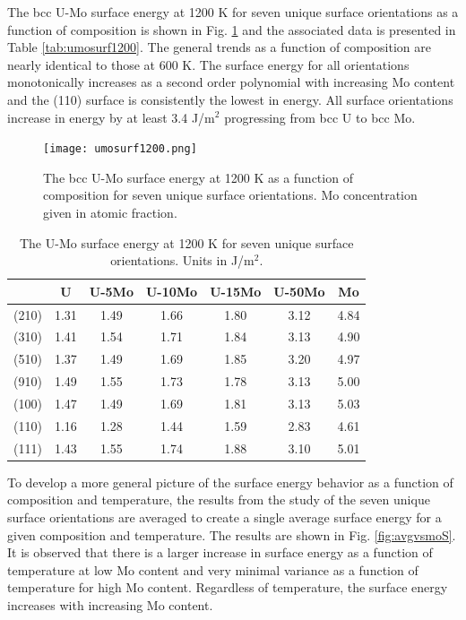 \documentclass[review]{elsarticle}
\begin{document}
\FloatBarrier

The bcc U-Mo surface energy at 1200 K for seven unique surface orientations as a function of composition is shown in Fig. \ref{fig:umosurf1200} and the associated data is presented in Table \ref{tab:umosurf1200}. The general trends as a function of composition are nearly identical to those at 600 K. The surface energy for all orientations monotonically increases as a second order polynomial with increasing Mo content and the (110) surface is consistently the lowest in energy. All surface orientations increase in energy by at least 3.4 J/m$^{2}$ progressing from bcc U to bcc Mo. 

\begin{figure}[h]
 \centering
 \texttt{[image: umosurf1200.png]} 
 \caption{The bcc U-Mo surface energy at 1200 K as a function of composition for seven unique surface orientations. Mo concentration given in atomic fraction.}
 \label{fig:umosurf1200}
\end{figure}

\begin{table}[h]
\caption{The U-Mo surface energy at 1200 K for seven unique surface orientations. Units in J/m$^{2}$.} \label{tab:umosurf1200}
\begin{center}
\begin{tabular}{|c|c|c|c|c|c|c|}
	\hline
 & U & U-5Mo & U-10Mo & U-15Mo & U-50Mo & Mo \\
\hline
(210) & 1.31 & 1.49 & 1.66 & 1.80 & 3.12 & 4.84 \\
(310)	 & 1.41 & 1.54 & 1.71 & 1.84 & 3.13 & 4.90 \\ 
(510)	 & 1.37 & 1.49 & 1.69 & 1.85 & 3.20 & 4.97 \\
(910)	 & 1.49 & 1.55 & 1.73 & 1.78 & 3.13 & 5.00 \\
(100)	 & 1.47 & 1.49 & 1.69 & 1.81 & 3.13 & 5.03 \\
(110)	 & 1.16 & 1.28 & 1.44 & 1.59 & 2.83 & 4.61 \\
(111)	 & 1.43 & 1.55 & 1.74 & 1.88 & 3.10 & 5.01 \\
 	 \hline
\end{tabular}
\end{center}
\label{default}
\end{table}



\FloatBarrier

To develop a more general picture of the surface energy behavior as a function of composition and temperature, the results from the study of the seven unique surface orientations are averaged to create a single average surface energy for a given composition and temperature. The results are shown in Fig. \ref{fig:avgvsmoS}. It is observed that there is a larger increase in surface energy as a function of temperature at low Mo content and very minimal variance as a function of temperature for high Mo content. Regardless of temperature, the surface energy increases with increasing Mo content. 
\end{document}
